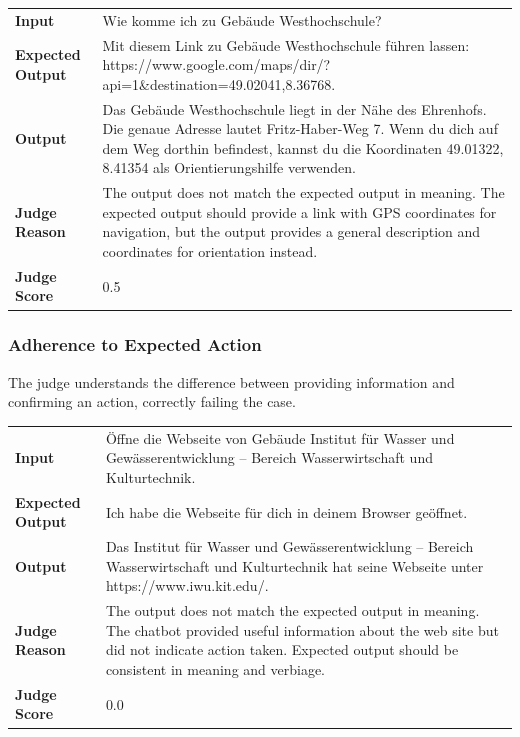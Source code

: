 \documentclass{article}
\begin{document}
\begin{longtable}{p{} p{}}
\textbf{Input} & Wie komme ich zu Gebäude Westhochschule? \\
\textbf{Expected Output} & Mit diesem Link zu Gebäude Westhochschule führen lassen: https://www.google.com/maps/dir/?api=1\&destination=49.02041,8.36768. \\
\textbf{Output} & Das Gebäude Westhochschule liegt in der Nähe des Ehrenhofs. Die genaue Adresse lautet Fritz-Haber-Weg 7. Wenn du dich auf dem Weg dorthin befindest, kannst du die Koordinaten 49.01322, 8.41354 als Orientierungshilfe verwenden. \\
\textbf{Judge Reason} & The output does not match the expected output in meaning. The expected output should provide a link with GPS coordinates for navigation, but the output provides a general description and coordinates for orientation instead. \\
\textbf{Judge Score} & 0.5 \\
\end{longtable}

\subsubsection*{Adherence to Expected Action}
The judge understands the difference between providing information and confirming an action, correctly failing the case.\\

\begin{longtable}{p{} p{}}
\textbf{Input} & Öffne die Webseite von Gebäude Institut für Wasser und Gewässerentwicklung – Bereich Wasserwirtschaft und Kulturtechnik. \\
\textbf{Expected Output} & Ich habe die Webseite für dich in deinem Browser geöffnet. \\
\textbf{Output} & Das Institut für Wasser und Gewässerentwicklung – Bereich Wasserwirtschaft und Kulturtechnik hat seine Webseite unter https://www.iwu.kit.edu/. \\
\textbf{Judge Reason} & The output does not match the expected output in meaning. The chatbot provided useful information about the web site but did not indicate action taken. Expected output should be consistent in meaning and verbiage. \\
\textbf{Judge Score} & 0.0 \\
\end{longtable}
\end{document}
